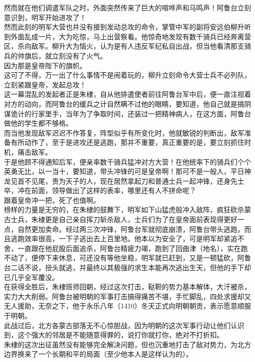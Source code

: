 \begin{multicols}{\theparacolNo}
然而就在他们调遣军队之时，外面突然传来了巨大的喧哗声和马鸣声！阿鲁台立刻意识到，明军开始进攻了！\\

然而此刻的明军大营也并没有接到发动总攻的命令，掌管中军的副将安远伯柳升听到外面乱成一片，大为吃惊，马上出营察看。他惊奇地发现有数千骑兵已经奔离营区，杀向敌军。柳升大为恼火，认为是有人违反军纪私自出战，但当他看清那支骑兵的帅旗后，就立刻没有了火气。\\

因为那是皇帝陛下的旗帜。\\

这可了不得，万一出了什么事情不是闹着玩的，柳升立刻命令大营士兵不必列队，立刻紧跟皇帝，发起总攻！\\

这一幕混乱的发起者正是朱棣，自从他排遣使者前往阿鲁台军中后，便一直注视着对方的动向，而阿鲁台的缓兵之计自然瞒不过他的眼睛，要知道，他自己就是搞阴谋诡计的行家里手，当年为了争取时间，还装过一把精神病人，在这方面，阿鲁台做他的学生都不够格。\\

而当他发现敌军迟迟不作答复，阵型似乎有所变化时，他就敏锐的判断出，敌军准备有所动作了，至于是进攻还是逃跑，那并不重要，真正重要的是，要立刻抓住时机，痛击敌军。\\

于是他顾不得通知后军，便亲率数千骑兵猛冲对方大营！在他统率下的骑兵们个个英勇无比，以一当十，要知道，带头冲锋的可是皇帝啊！那可不是一般人，平日神龙见首不见尾，贵为天子的人，现在居然拿起刀和普通士兵一起冲锋，还身先士卒，冲在前面，领导做出了这样的表率，哪里还有人不拼命呢？\\

跟着皇帝冲一把，死了也值啊。\\

榜样的力量是无穷的，在朱棣的鼓舞下，明军如下山猛虎般冲入敌阵，疯狂砍杀蒙古士兵，朱棣更是自己亲自挥刀斩杀敌人，士兵们为了在皇帝面前表现得更好一点，自然更加卖命。经过两三次冲锋，阿鲁台军就彻底崩溃，阿鲁台带头逃跑，而且逃跑效率很高，一下子逃出去上百里地。他本以为安全了，可是明军却紧追不舍，一直跟在他屁股后面追杀，阿鲁台精疲力竭，跑到了回曲津（地名），实在跑不动了，便停下来休息，可还没有等他坐稳，明军就已赶到，又是一顿猛砍，阿鲁台二话不说，扭头就逃，并最终以其极强的求生本能再次逃出生天，但他的手下却已几乎全军覆没。\\

在获得全胜后，朱棣班师回朝，经过这次打击，鞑靼的势力基本解体，大汗被杀，实力大大削弱。阿鲁台被明朝的军事打击搞得痛苦不堪，手忙脚乱，四处求援却又无人援助，无奈之下，他于永乐八年（1410）冬天正式向明朝朝贡，表示愿意顺服于明朝。\\

此战过后，北方各蒙古部落无不心惊胆战，因为明朝的这次军事行动让他们认识到，这个强大的邻居是不能随意得罪的，说打你就打你，绝对不打折扣。\\

朱棣的这次出征虽然没有能够完全解决问题，但也沉重地打击了敌对势力，为北方边界换来了一个长期和平的局面（至少他本人是这样认为的）。\\
\ifnum{}
	\end{multicols}
\fi
\newpage

